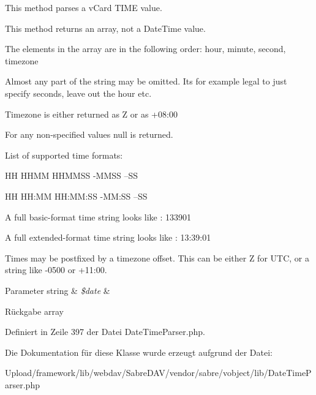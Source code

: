 This method parses a v\+Card T\+I\+ME value.

This method returns an array, not a Date\+Time value.

The elements in the array are in the following order\+: hour, minute, second, timezone

Almost any part of the string may be omitted. It\textquotesingle{}s for example legal to just specify seconds, leave out the hour etc.

Timezone is either returned as \textquotesingle{}Z\textquotesingle{} or as \textquotesingle{}+08\+:00\textquotesingle{}

For any non-\/specified values null is returned.

List of supported time formats\+:

HH H\+H\+MM H\+H\+M\+M\+SS -\/\+M\+M\+SS --SS

HH HH\+:MM H\+H\+:\+MM\+:SS -\/\+MM\+:SS --SS

A full basic-\/format time string looks like \+: 133901

A full extended-\/format time string looks like \+: 13\+:39\+:01

Times may be postfixed by a timezone offset. This can be either \textquotesingle{}Z\textquotesingle{} for U\+TC, or a string like -\/0500 or +11\+:00.


\begin{DoxyParams}[1]{Parameter}
string & {\em \$date} & \\
\hline
\end{DoxyParams}
\begin{DoxyReturn}{Rückgabe}
array 
\end{DoxyReturn}


Definiert in Zeile 397 der Datei Date\+Time\+Parser.\+php.



Die Dokumentation für diese Klasse wurde erzeugt aufgrund der Datei\+:\begin{DoxyCompactItemize}
\item 
Upload/framework/lib/webdav/\+Sabre\+D\+A\+V/vendor/sabre/vobject/lib/Date\+Time\+Parser.\+php\end{DoxyCompactItemize}
